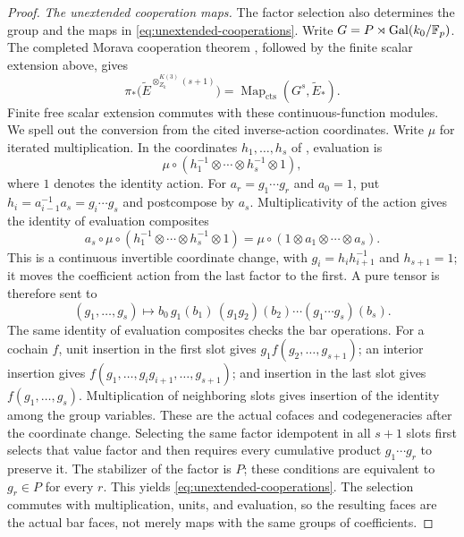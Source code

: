 \begin{proof}
\smallskip\noindent\emph{The unextended cooperation maps.}
The factor selection also determines the group and the maps in
\eqref{eq:unextended-cooperations}.  Write
$G=P\rtimes\operatorname{Gal}(k_0/\mathbb F_p)$.  The completed Morava
cooperation theorem
\cite[Proposition~2.2 and Equations~(2.3) and~(2.5)]{DH04}, followed by
the finite scalar extension above, gives
\[
  \pi_*\bigl(\widetilde E^{\otimes^{K(3)}_{Z_k}(s+1)}\bigr)
     =\operatorname{Map}_{\mathrm{cts}}(G^s,\widetilde E_*).
\]
Finite free scalar extension commutes with these continuous-function
modules.  We spell out the conversion from the cited inverse-action
coordinates. Write $\mu$ for iterated multiplication. In the coordinates
$h_1,\ldots,h_s$ of \citet[Equation~(2.5)]{DH04}, evaluation is
\[
 \mu\circ(h_1^{-1}\otimes\cdots\otimes h_s^{-1}\otimes1),
\]
where $1$ denotes the identity action.
For $a_r=g_1\cdots g_r$ and $a_0=1$, put
$h_i=a_{i-1}^{-1}a_s=g_i\cdots g_s$ and postcompose by $a_s$.
Multiplicativity of the action gives the identity of evaluation composites
\begin{equation}\label{eq:amitsur-coordinate-conversion}
 a_s\circ\mu\circ(h_1^{-1}\otimes\cdots\otimes h_s^{-1}\otimes1)
 =\mu\circ(1\otimes a_1\otimes\cdots\otimes a_s).
\end{equation}
This is a continuous invertible coordinate change, with
$g_i=h_i h_{i+1}^{-1}$ and $h_{s+1}=1$; it moves the coefficient action
from the last factor to the first. A pure tensor is therefore sent to
\[
 (g_1,\ldots,g_s)\longmapsto
 b_0\,g_1(b_1)\,(g_1g_2)(b_2)\cdots(g_1\cdots g_s)(b_s).
\]
The same identity of evaluation composites checks the bar operations.
For a cochain $f$, unit insertion in the first slot gives
$g_1 f(g_2,\ldots,g_{s+1})$;
an interior insertion gives
$f(g_1,\ldots,g_i g_{i+1},\ldots,g_{s+1})$; and insertion in the last
slot gives $f(g_1,\ldots,g_s)$. Multiplication of neighboring slots gives
insertion of the identity among the group variables. These are the actual
cofaces and codegeneracies after the coordinate change.
Selecting the same factor idempotent in all $s+1$ slots first selects
that value factor and then requires every cumulative product
$g_1\cdots g_r$ to preserve it.  The stabilizer of the factor is $P$;
these conditions are equivalent to $g_r\in P$ for every $r$.
This yields \eqref{eq:unextended-cooperations}.  The selection commutes
with multiplication, units, and evaluation, so the resulting faces are
the actual bar faces, not merely maps with the same groups of
coefficients.
\end{proof}

